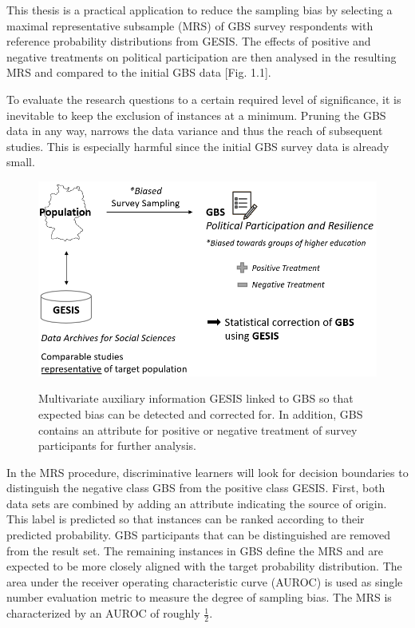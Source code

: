 This thesis is a practical application to reduce the sampling bias by selecting a maximal representative subsample (MRS) of GBS survey respondents with reference probability distributions from GESIS. The effects of positive and negative treatments on political participation are then analysed in the resulting MRS and compared to the initial GBS data [Fig. 1.1].

To evaluate the research questions to a certain required level of significance, it is inevitable to keep the exclusion of instances at a minimum. Pruning the GBS data in any way, narrows the data variance and thus the reach of subsequent studies. This is especially harmful since the initial GBS survey data is already small.

\vspace{20pt}
\begin{figure}[ht]
	\begin{center}
		\includegraphics[scale=0.60,angle=0]{fig/overview}
		\label{project}
		\caption{Multivariate auxiliary information GESIS linked to GBS so that expected bias can be detected and corrected for. In addition, GBS contains an attribute for positive or negative treatment of survey participants for further analysis.}
	\end{center}
\end{figure}

In the MRS procedure, discriminative learners will look for decision boundaries to distinguish the negative class GBS from the positive class GESIS. First, both data sets are combined by adding an attribute indicating the source of origin. This label is predicted so that instances can be ranked according to their predicted probability. GBS participants that can be distinguished are removed from the result set. The remaining instances in GBS define the MRS and are expected to be more closely aligned with the target probability distribution.  The area under the receiver operating characteristic curve (AUROC) is used as single number evaluation metric to measure the degree of sampling bias. The MRS is characterized by an AUROC of roughly \(\frac{1}{2}\).

